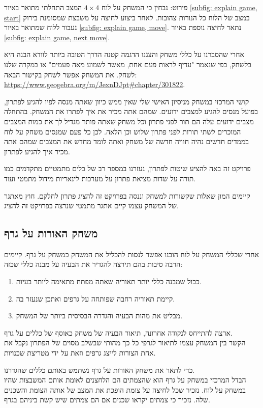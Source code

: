 \documentclass[12pt,leqno]{article}
\begin{document}
פירוט:
נבחין כי המשחק 
על לוח
$4 \times 4$
המצב התחלתי מתואר
באיור
\ref{subfig: explain game, start}
במצב של הלוח
כל הנורות צהובות.
לאחר ביצוע לחיצה על משבצת שמסומנת בירוק נעבור ללוח שמתואר באיור 
\ref{subfig: explain game, move}.
נתאר לחיצה נוספת באיור 
\ref{subfig: explain game, next move}.

אחרי שהסברנו על כללי משחק והצגנו הדגמה קטנה הדרך הטובה ביותר לוודא הבנה היא בלשחק,
כפי שנאמר "עדיף לראות פעם אחת, מאשר לשמוע מאה פעמים"
או במקרה שלנו לשחק.
את המשחק אפשר לשחק בקישור הבאה:
\url{https://www.geogebra.org/m/JexnDJpt#chapter/301822}.

קושי המרכזי במשחק מניסיון האישי שלי שאין ממש כיוון שאתה מנסה לפיו להגיע לפתרון, בפועל מנסים להגיע למצבים ידועים.
שמהם אתה מכיר את איך לפתרו את המשחק. בהתחלה מצבים ידועים עלה הם תור לפני פתרון וכל 
משחק שאתה פותר מגדיל לך את כמות המצבים המוכרים לשתי תורות לפני פתרון שלוש וכן הלאה.
לכן כל פעם שמנסים משחק על לוח בממדים חדשים נהיה חוויה חדשה של משחק 
ואתה 
לומד מחדש את המצבים שמהם אתה מכיר איך להגיע לפתרון.

פרויקט זה באה להציע שיטות לפתרון, 
נעזרנו במספר רב של כלים מתמטיים מתקדמים
כמו תורה על שדות מציאת פתרון על מערכות לינאריות מידול מתמטי ועוד.

קיימים המון שאלות שקשורות למשחק וננסה בפרויקט זה להציג פתרון לחלקם.
חוץ מאתגר של המשחק עצמו קיים אתגר מתמטי שנרצה בפרויקט זה להציג.

\subsection{ משחק האורות על גרף}
אחרי שכללי המשחק על לוח הובנו אפשר לנסות להכליל את המשחק כמשחק על גרף.
קיימים הרבה סיבות בהם תירצה להגדיר את הבעיה על מבנה כללי שכזה:

\begin{enumerate}
    \item 
    ככול שמבנה כללי יותר תאוריה שאתה מפתח מתאימה ליותר בעיות.
    \item 
    קיימת תאוריה רחבה שפותחה על גרפים ואתכן שנעזר בה.
    \item 
    מבליט את מהות הבעיה והגדרה הבסיסית ביותר של המשחק.
\end{enumerate}

ארצה להתייחס לנקודה אחרונה, תיאור הבעיה של משחק
כאוסף של כללים על גרף.
\\
הקשר בין המשחק עצמו לתיאור לגרפי כל כך מהותי
שבשלב מסוים של הפתרון נקבל את אחת הצורות לייצג גרפים וזאת על ידי מטריצת שכנויות.

כדי לתאר את משחק האורות על גרף נשתמש באותם כללים שהגדרנו.
\\
הבדל המרכזי במשחק על גרף הוא
שהצמתים הם הלחצנים לאומת אותם המשבצות שהיו במשחק על לוח.
נזכיר שכל לחיצה על צומת הופכת את המצב של אותה הצומת והשכנים שלה.
נזכיר כי צמתים יקראו שכנים אם הם צמתים שיש
קשת ביניהם בגרף.
\end{document}
